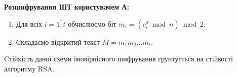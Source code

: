 \textbf{Розшифрування ШТ користувачем А:}
\begin{enumerate} 
\item Для всіх $i = \overline{1,t}$ обчислюємо біт $m_{i} = 
\left(c_{i}^{d}\bmod n \right) \bmod 2$.

\item Складаємо відкритий текст $M = m_{1}m_{2}...m_{t}$.
\end{enumerate}
Cтійкість даної схеми імовірнісного шифрування грунтується на стійкості алгоритму RSA.


